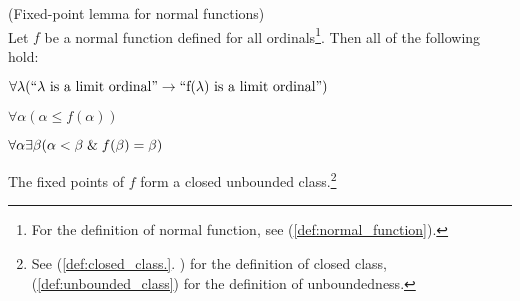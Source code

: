 % 
%
%

\begin{lemma}{(Fixed-point lemma for normal functions)}\label{lemma:normal_fixed_point}\\
Let $f$ be a normal function defined for all ordinals\footnote{For the definition of normal function, see (\ref{def:normal_function}).}. Then all of the following hold:
\bce[(i)]
\item $\forall \lambda(\mbox{``$\lambda$ is a limit ordinal''} \rightarrow \mbox{``f($\lambda$) is a limit ordinal''})$
\item $\forall \alpha (\alpha \leq f(\alpha))$
\item $\forall \alpha \exists \beta (\alpha < \beta \mathrel{\&} f(\beta) = \beta)$
\item The fixed points of $f$ form a closed unbounded class.\footnote{See (\ref{def:closed_class.}.%
) for the definition of closed class, (\ref{def:unbounded_class}) for the definition of unboundedness.}
\ece
\end{lemma}

